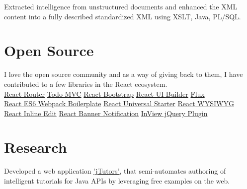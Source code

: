 \documentclass[]{my-resume-openfont}
\begin{document}
\begin{minipage}[t]{0.66\textwidth}
\begin{tightemize}
\item Extracted intelligence from unstructured documents and enhanced the XML content into a fully described standardized XML using XSLT, Java, PL/SQL.
\end{tightemize}


\section{Open Source}
I love the open source community and as a way of giving back to them, I have contributed to a few libraries in the React ecosystem. \\
\sectionsep
{}
\href{https://github.com/rackt/react-router}{React Router} \textbullet{} \href{https://github.com/tastejs/todomvc}{Todo MVC} \textbullet{} \href{https://github.com/react-bootstrap/react-bootstrap}{React Bootstrap} 
\textbullet{} \href{https://github.com/ipselon/react-ui-builder}{React UI Builder} \textbullet{} \href{https://github.com/facebook/flux}{Flux} \\
\href{https://github.com/vasanthk/react-es6-webpack-boilerplate}{React ES6 Webpack Boilerplate} \textbullet{} \href{https://github.com/vasanthk/react-universal-starter}{React Universal Starter} 
\textbullet{} \href{https://github.com/bmcmahen/react-wysiwyg}{React WYSIWYG} \\ 
\href{https://github.com/vasanthk/react-inline-edit}{React Inline Edit} \textbullet{} \href{https://github.com/vasanthk/react-banner-notification}{React Banner Notification} 
\textbullet{} \href{https://github.com/vasanthk/InView-jQuery-Plugin}{InView jQuery Plugin}
\sectionsep


\section{Research}
Developed a web application \href{http://ir.library.oregonstate.edu/xmlui/handle/1957/30097}{'jTutors'}, that semi-automates authoring of intelligent tutorials for Java APIs by leveraging free examples on the web.
\sectionsep


\end{minipage}
\end{document}
